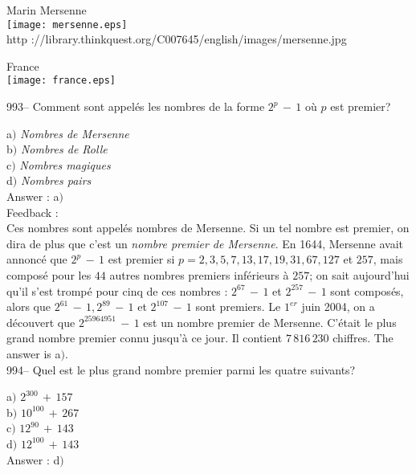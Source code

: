 \documentclass[letterpaper, 12pt]{article}
\begin{document}
        \begin{center}
        Marin Mersenne\\
    \texttt{[image: mersenne.eps]}\\
        {\footnotesize http
://library.thinkquest.org/C007645/english/images/mersenne.jpg}
    \end{center}

        \begin{center}
        France\\
    \texttt{[image: france.eps]}\\
    \end{center}

993-- Comment sont appel\'es les nombres de la forme $2^p\,-\,1$
o\`u $p$ est premier?

a$)$ {\sl Nombres de Mersenne} \\
b$)$ {\sl Nombres de Rolle} \\
c$)$ {\sl Nombres magiques} \\
d$)$ {\sl Nombres pairs}\\

Answer : a$)$\\

Feedback : \\
Ces nombres sont appel\'es nombres de Mersenne. Si un tel nombre est
premier, on dira de plus que c'est un {\sl nombre premier de
Mersenne}. En 1644, Mersenne avait annonc\'e que $2^p\,-\,1$ est
premier si $p=2,3,5,7,13,17,19,31,67,127$ et $257$, mais compos\'e
pour les $44$ autres nombres premiers inf\'erieurs \`a $257$; on
sait aujourd'hui qu'il s'est tromp\'e pour cinq de ces nombres :
$2^{67}\,-\,1$ et $2^{257}\,-\,1$ sont compos\'es, alors que
$2^{61}\,-\,1,2^{89}\,-\,1$ et $2^{107}\,-\,1$ sont premiers. Le
$1^{er}$ juin 2004, on a d\'ecouvert que $2^{25 964 951}\,-\,1$ est
un nombre premier de Mersenne. C'\'etait le plus grand nombre
premier connu jusqu'\`a ce jour. Il contient $7\,816\,230$ chiffres.
The answer is a$)$.\\

994-- Quel est le plus grand nombre premier parmi les quatre
suivants?

a$)$ $2^{300}\,+\,157$ \\
b$)$ $10^{100}\,+\,267$ \\
c$)$ $12^{90}\,+\,143$ \\
d$)$ $12^{100}\,+\,143$\\

Answer : d$)$\\
\end{document}
